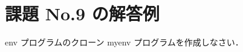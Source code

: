 \documentclass[a4j,twcolumn,11pt,nomag]{ltjarticle}      %
\begin{document}
\onecolumn

\section*{課題 No.9 の解答例}
env プログラムのクローン myenv プログラムを作成しなさい．
\end{document}
